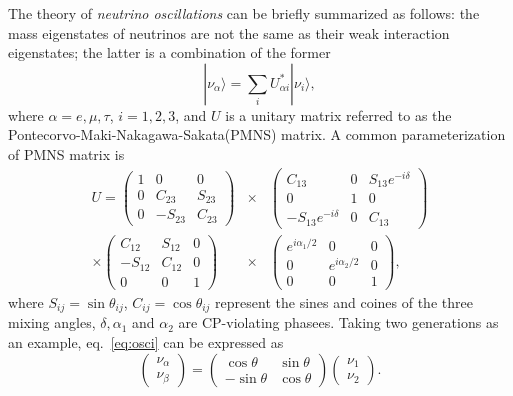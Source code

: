 The theory of \emph{neutrino oscillations} can be briefly summarized as follows: the mass eigenstates of neutrinos are not the same as their weak interaction eigenstates; the latter is a combination of the former
\begin{equation}
  \label{eq:osci}
  |\nu_{\alpha}\rangle=\sum_{i}U^{*}_{\alpha i}|\nu_{i}\rangle,
\end{equation}
where $\alpha=e,\mu,\tau$, $i=1,2,3$, and $U$ is a unitary matrix referred to as the Pontecorvo-Maki-Nakagawa-Sakata(PMNS) matrix. A common parameterization of PMNS matrix is
\begin{eqnarray*}
  \label{eq:pmns}
  U = \left(\begin{array}{ccc}
      1 & 0 & 0 \\ 0 & C_{23} & S_{23} \\ 0 & -S_{23} & C_{23}
    \end{array}\right) &\times&
  \left(\begin{array}{ccc}
      C_{13} & 0 & S_{13}e^{-i\delta} \\ 
      0 & 1 & 0 \\ -S_{13}e^{-i\delta} & 0 & C_{13}
    \end{array}\right) \\\times
  \left(\begin{array}{ccc}
       C_{12} & S_{12} & 0 \\ -S_{12} & C_{12} & 0 \\ 0 & 0 & 1
    \end{array}\right) &\times&
  \left(\begin{array}{ccc}
      e^{i\alpha_1/2} & 0 & 0 \\ 0 & e^{i\alpha_2/2} & 0 \\ 0 & 0 & 1
    \end{array}\right),
\end{eqnarray*}
where $S_{ij} = \sin\theta_{ij}$, $C_{ij} = \cos\theta_{ij}$ represent the sines and coines of the three mixing angles, $\delta, \alpha_1$ and $\alpha_2$ are CP-violating phasees. Taking two generations as an example, eq.~\ref{eq:osci} can be expressed as
\begin{equation}
  \label{eq:osci2}
  \left(\begin{array}{c}\nu_{\alpha}\\\nu_{\beta}\end{array}\right)=
  \left(\begin{array}{cc} \cos\theta & \sin\theta\\
      -\sin\theta & \cos\theta \end{array}\right)
  \left(\begin{array}{c}\nu_{1}\\\nu_{2}\end{array}\right).
\end{equation}
